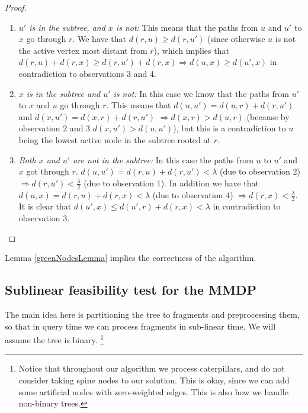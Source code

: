 \documentclass[11pt,a4paper]{article}
\theoremstyle{definition}
\theoremstyle{remark}
\begin{document}
\begin{proof}
{\begin{enumerate}
\item \textit{$u'$ is in the subtree, and $x$ is not:}
This means that the paths from $u$ and $u'$ to $x$ go through $r$. We have that $d(r,u) \geq d(r,u')$ (since otherwise $u$ is not the active vertex most distant from $r$), which implies that $d(r,u)+d(r,x) \geq d(r,u')+d(r,x)\Rightarrow d(u,x) \geq d(u',x)$ in contradiction to observations 3 and 4.

\item \textit{$x$ is in the subtree and $u'$ is not:}
In this case we know that the paths from $u'$ to $x$ and $u$ go through $r$.
This means that $d(u,u') = d(u,r)+d(r,u')$ and $d(x,u') = d(x,r)+d(r,u')$ $\Rightarrow d(x,r)>d(u,r)$ (because by observation 2 and 3 $d(x,u')>d(u,u')$), but this is a contradiction to $u$ being the lowest active node in the subtree rooted at $r$.

\item \textit{Both $x$ and $u'$ are not in the subtree:}
In this case the paths from $u$ to $u'$ and $x$ got through $r$. $d(u,u') = d(r,u)+d(r,u') < \lambda$ (due to observation 2) $\Rightarrow d(r,u')<\frac{\lambda}{2}$ (due to observation 1). In addition we have that $d(u,x) = d(r,u)+d(r,x) < \lambda$ (due to observation 4) $\Rightarrow d(r,x)<\frac{\lambda}{2}$. It is clear that $d(u',x) \leq d(u',r)+d(r,x) < \lambda$ in contradiction to observation 3.
\end{enumerate}
}
\end{proof}
Lemma \ref{greenNodesLemma} implies the correctness of the algorithm.


\subsection{Sublinear feasibility test for the MMDP}
The main idea here is partitioning the tree to fragments and preprocessing them, so that in query time we can process fragments in sub-linear time. We will assume the tree is binary. \footnote{Notice that throughout our algorithm we process caterpillars, and do not consider taking spine nodes to our solution. This is okay, since we can add some artificial nodes with zero-weighted edges. This is also how we handle non-binary trees.}
\end{document}
